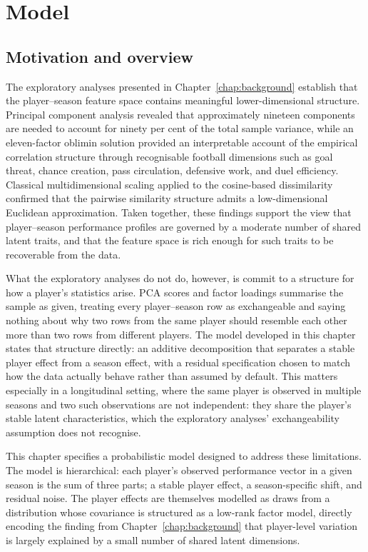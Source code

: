 \chapter{Model}
\label{chap:methodology}

\section{Motivation and overview}

The exploratory analyses presented in Chapter~\ref{chap:background} establish that the player--season feature space contains meaningful lower-dimensional structure. Principal component analysis revealed that approximately nineteen components are needed to account for ninety per cent of the total sample variance, while an eleven-factor oblimin solution provided an interpretable account of the empirical correlation structure through recognisable football dimensions such as goal threat, chance creation, pass circulation, defensive work, and duel efficiency. Classical multidimensional scaling applied to the cosine-based dissimilarity confirmed that the pairwise similarity structure admits a low-dimensional Euclidean approximation. Taken together, these findings support the view that player--season performance profiles are governed by a moderate number of shared latent traits, and that the feature space is rich enough for such traits to be recoverable from the data.

What the exploratory analyses do not do, however, is commit to a structure for how a player's statistics arise. PCA scores and factor loadings summarise the sample as given, treating every player--season row as exchangeable and saying nothing about why two rows from the same player should resemble each other more than two rows from different players. The model developed in this chapter states that structure directly: an additive decomposition that separates a stable player effect from a season effect, with a residual specification chosen to match how the data actually behave rather than assumed by default. This matters especially in a longitudinal setting, where the same player is observed in multiple seasons and two such observations are not independent: they share the player's stable latent characteristics, which the exploratory analyses' exchangeability assumption does not recognise.

This chapter specifies a probabilistic model designed to address these limitations. The model is hierarchical: each player's observed performance vector in a given season is the sum of three parts; a stable player effect, a season-specific shift, and residual noise. The player effects are themselves modelled as draws from a distribution whose covariance is structured as a low-rank factor model, directly encoding the finding from Chapter~\ref{chap:background} that player-level variation is largely explained by a small number of shared latent dimensions.

